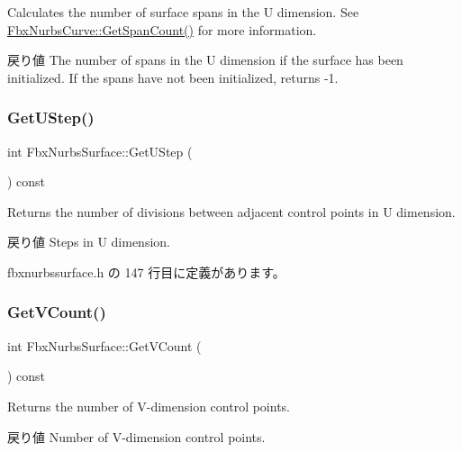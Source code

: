 Calculates the number of surface spans in the U dimension. See \hyperlink{class_fbx_nurbs_curve_acb1cf2016f20b2a0c8df382046c7d3ea}{Fbx\+Nurbs\+Curve\+::\+Get\+Span\+Count()} for more information. \begin{DoxyReturn}{戻り値}
The number of spans in the U dimension if the surface has been initialized. If the spans have not been initialized, returns -\/1. 
\end{DoxyReturn}
\mbox{\label{class_fbx_nurbs_surface_aa726194cee04c25a68b695e5588d62eb}} 
\subsubsection{\texorpdfstring{Get\+U\+Step()}{GetUStep()}}
{\footnotesize\ttfamily int Fbx\+Nurbs\+Surface\+::\+Get\+U\+Step (\begin{DoxyParamCaption}{ }\end{DoxyParamCaption}) const\hspace{0.3cm}{\ttfamily [inline]}}

Returns the number of divisions between adjacent control points in U dimension. \begin{DoxyReturn}{戻り値}
Steps in U dimension. 
\end{DoxyReturn}


 fbxnurbssurface.\+h の 147 行目に定義があります。

\mbox{\label{class_fbx_nurbs_surface_a019ea2ce9a16d0f4a626209da05f52a3}} 
\subsubsection{\texorpdfstring{Get\+V\+Count()}{GetVCount()}}
{\footnotesize\ttfamily int Fbx\+Nurbs\+Surface\+::\+Get\+V\+Count (\begin{DoxyParamCaption}{ }\end{DoxyParamCaption}) const\hspace{0.3cm}{\ttfamily [inline]}}

Returns the number of V-\/dimension control points. \begin{DoxyReturn}{戻り値}
Number of V-\/dimension control points. 
\end{DoxyReturn}


